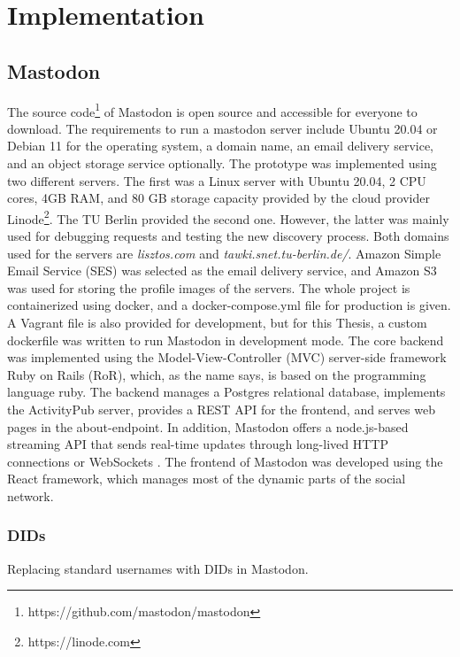 \chapter{Implementation}
\label{cha:implementation}

\section{Mastodon}

The source code\footnote{https://github.com/mastodon/mastodon} of Mastodon is open source and accessible for everyone to download. The requirements to run a mastodon server include Ubuntu 20.04 or Debian 11 for the operating system, a domain name, an email delivery service, and an object storage service optionally. The prototype was implemented using two different servers. The first was a Linux server with Ubuntu 20.04, 2 CPU cores,  4GB RAM, and 80 GB storage capacity provided by the cloud provider Linode\footnote{https://linode.com}. The TU Berlin provided the second one. However, the latter was mainly used for debugging requests and testing the new discovery process. Both domains used for the servers are \emph{lisztos.com} and \emph{tawki.snet.tu-berlin.de/}. Amazon Simple Email Service (SES) was selected as the email delivery service, and Amazon S3 was used for storing the profile images of the servers. The whole project is containerized using docker, and a docker-compose.yml file for production is given. A Vagrant file is also provided for development, but for this Thesis, a custom dockerfile was written to run Mastodon in development mode. The core backend was implemented using the Model-View-Controller (MVC) server-side framework Ruby on Rails (RoR), which, as the name says, is based on the programming language ruby. The backend manages a Postgres relational database, implements the ActivityPub server, provides a REST API for the frontend, and serves web pages in the about-endpoint. In addition, Mastodon offers a node.js-based streaming API that sends real-time updates through long-lived HTTP connections or WebSockets \cite{rochko_2020}. The frontend of Mastodon was developed using the React framework, which manages most of the dynamic parts of the social network.

\subsection{DIDs}

Replacing standard usernames with DIDs in Mastodon. 


